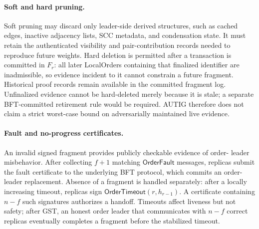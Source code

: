\paragraph{Soft and hard pruning.}
Soft pruning may discard only leader-side derived structures, such as cached
edges, inactive adjacency lists, SCC metadata, and condensation state. It
must retain the authenticated visibility and pair-contribution records needed
to reproduce future weights. Hard deletion is permitted after a transaction
is committed in $F_r$: all later LocalOrders containing that finalized
identifier are inadmissible, so evidence incident to it cannot constrain a
future fragment. Historical proof records remain available in the committed
fragment log. Unfinalized evidence cannot be hard-deleted merely because it
is stale; a separate BFT-committed retirement rule would be required. AUTIG
therefore does not claim a strict worst-case bound on adversarially maintained
live evidence.

\paragraph{Fault and no-progress certificates.}
An invalid signed fragment provides publicly checkable evidence of order-
leader misbehavior. After collecting $f+1$ matching
$\mathsf{OrderFault}$ messages, replicas submit the fault certificate to the
underlying BFT protocol, which commits an order-leader replacement. Absence
of a fragment is handled separately: after a locally increasing timeout,
replicas sign $\mathsf{OrderTimeout}(r,h_{r-1})$. A certificate containing
$n-f$ such signatures authorizes a handoff. Timeouts affect liveness but not
safety; after GST, an honest order leader that communicates with $n-f$
correct replicas eventually completes a fragment before the stabilized
timeout.

